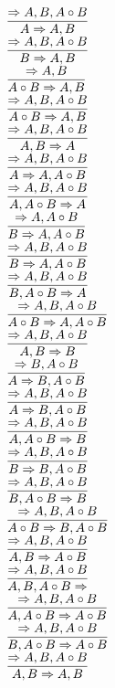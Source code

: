 \documentclass[11pt]{article}
\begin{document}
\begin{center}
\\$\infer{A\Rightarrow A, B}{\Rightarrow A, B, A\circ B}$
\bigskip
\\$\infer{B\Rightarrow A, B}{\Rightarrow A, B, A\circ B}$
\bigskip
\\$\infer{A\circ B\Rightarrow A, B}{\Rightarrow A, B}$
\bigskip
\\$\infer{A\circ B\Rightarrow A, B}{\Rightarrow A, B, A\circ B}$
\bigskip
\\$\infer{A, B\Rightarrow A}{\Rightarrow A, B, A\circ B}$
\bigskip
\\$\infer{A\Rightarrow A, A\circ B}{\Rightarrow A, B, A\circ B}$
\bigskip
\\$\infer{A, A\circ B\Rightarrow A}{\Rightarrow A, B, A\circ B}$
\bigskip
\\$\infer{B\Rightarrow A, A\circ B}{\Rightarrow A, A\circ B}$
\bigskip
\\$\infer{B\Rightarrow A, A\circ B}{\Rightarrow A, B, A\circ B}$
\bigskip
\\$\infer{B, A\circ B\Rightarrow A}{\Rightarrow A, B, A\circ B}$
\bigskip
\\$\infer{A\circ B\Rightarrow A, A\circ B}{\Rightarrow A, B, A\circ B}$
\bigskip
\\$\infer{A, B\Rightarrow B}{\Rightarrow A, B, A\circ B}$
\bigskip
\\$\infer{A\Rightarrow B, A\circ B}{\Rightarrow B, A\circ B}$
\bigskip
\\$\infer{A\Rightarrow B, A\circ B}{\Rightarrow A, B, A\circ B}$
\bigskip
\\$\infer{A, A\circ B\Rightarrow B}{\Rightarrow A, B, A\circ B}$
\bigskip
\\$\infer{B\Rightarrow B, A\circ B}{\Rightarrow A, B, A\circ B}$
\bigskip
\\$\infer{B, A\circ B\Rightarrow B}{\Rightarrow A, B, A\circ B}$
\bigskip
\\$\infer{A\circ B\Rightarrow B, A\circ B}{\Rightarrow A, B, A\circ B}$
\bigskip
\\$\infer{A, B\Rightarrow A\circ B}{\Rightarrow A, B, A\circ B}$
\bigskip
\\$\infer{A, B, A\circ B\Rightarrow }{\Rightarrow A, B, A\circ B}$
\bigskip
\\$\infer{A, A\circ B\Rightarrow A\circ B}{\Rightarrow A, B, A\circ B}$
\bigskip
\\$\infer{B, A\circ B\Rightarrow A\circ B}{\Rightarrow A, B, A\circ B}$
\bigskip
\\$\infer{A, B\Rightarrow A, B}{\Rightarrow A, B, A\circ B}$
\bigskip

\end{center}
\end{document}
